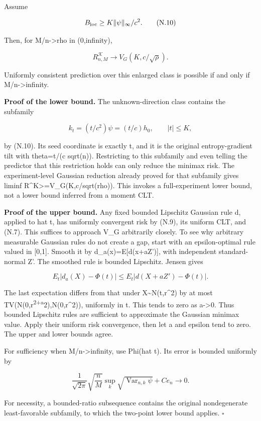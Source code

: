 Assume

\[
B_{\rm loc}\ge K\|\psi\|_\infty/c^2.
\tag{N.10}
\]

Then, for M/n-\textgreater rho in (0,infinity),

\[
\boxed{R^{\mathcal K}_{n,M}\longrightarrow V_G(K,c/\sqrt\rho).}
\tag{N.11}
\]

Uniformly consistent prediction over this enlarged class is possible if
and only if M/n-\textgreater infinity.

\textbf{Proof of the lower bound.} The unknown-direction class contains
the subfamily

\[
k_t=(t/c^2)\psi=(t/c)h_0,\qquad |t|\le K,
\]

by (N.10). Its seed coordinate is exactly t, and it is the original
entropy-gradient tilt with theta=t/(c sqrt(n)). Restricting to this
subfamily and even telling the predictor that this restriction holds can
only reduce the minimax risk. The experiment-level Gaussian reduction
already proved for that subfamily gives liminf
R\^{}K\textgreater=V\_G(K,c/sqrt(rho)). This invokes a full-experiment
lower bound, not a lower bound inferred from a moment CLT.

\textbf{Proof of the upper bound.} Any fixed bounded Lipschitz Gaussian
rule d, applied to hat t, has uniformly convergent risk by (N.9), its
uniform CLT, and (N.7). This suffices to approach V\_G arbitrarily
closely. To see why arbitrary measurable Gaussian rules do not create a
gap, start with an epsilon-optimal rule valued in {[}0,1{]}. Smooth it
by d\_a(x)=E{[}d(x+aZ'){]}, with independent standard-normal Z'. The
smoothed rule is bounded Lipschitz. Jensen gives

\[
E_t|d_a(X)-\Phi(t)|
\le E_t|d(X+aZ')-\Phi(t)|.
\]

The last expectation differs from that under
X\textasciitilde N(t,r\^{}2) by at most
TV(N(0,r\textsuperscript{2+a}2),N(0,r\^{}2)), uniformly in t. This tends
to zero as a-\textgreater0. Thus bounded Lipschitz rules are sufficient
to approximate the Gaussian minimax value. Apply their uniform risk
convergence, then let a and epsilon tend to zero. The upper and lower
bounds agree.

For sufficiency when M/n-\textgreater infinity, use Phi(hat t). Its
error is bounded uniformly by

\[
\frac1{\sqrt{2\pi}}\sqrt{\frac nM}
\sup_k\sqrt{\operatorname{Var}_{n,k}\psi}+Ce_n\to0.
\]

For necessity, a bounded-ratio subsequence contains the original
nondegenerate least-favorable subfamily, to which the two-point lower
bound applies. \(\square\)

